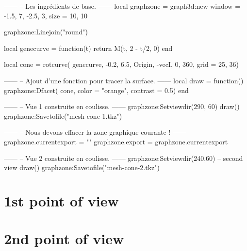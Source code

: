 \documentclass[varwidth, border = 3pt]{standalone}
\begin{document}
\begin{luadraw}{}
------
-- Les ingrédients de base.
------
    local graphzone = graph3d:new{
        window = {-1.5, 7, -2.5, 3},
        size   = {10, 10}
    }

    graphzone:Linejoin("round")

    local genecurve = function(t)
        return M(t, 2 - t/2, 0)
    end

    local cone = rotcurve(
        genecurve, -0.2, 6.5,
        {Origin, -vecI},
        0, 360,
        {grid = {25, 36}})

------
-- Ajout d'une fonction pour tracer la surface.
------
    local draw = function()
        graphzone:Dfacet(
            cone,
            {color    = "orange",
             contrast = 0.5})
    end

------
-- Vue 1 construite en coulisse.
------
    graphzone:Setviewdir(290, 60)
    draw()
    graphzone:Savetofile("mesh-cone-1.tkz")

------
-- Nous devons effacer la zone graphique courante !
------
    graphzone.currentexport = {""}
    graphzone.export        = graphzone.currentexport

------
-- Vue 2 construite en coulisse.
------
    graphzone:Setviewdir(240,60) -- second view
    draw()
    graphzone:Savetofile("mesh-cone-2.tkz")
\end{luadraw}

\section*{1st point of view}




\section*{2nd point of view}


\end{document}
